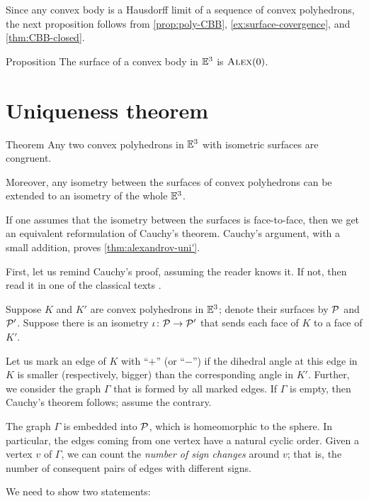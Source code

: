 Since any convex body is a Hausdorff limit of a sequence of convex polyhedrons, the next proposition follows from \ref{prop:poly-CBB}, \ref{ex:surface-covergence}, and \ref{thm:CBB-closed}.

\begin{thm}{Proposition}\label{prop:conv-surf-CBB(0)}
The surface of a convex body in $\mathbb{E}^3$ is $\textsc{Alex}(0)$.
\end{thm}

\section{Uniqueness theorem}

\begin{thm}{Theorem}\label{thm:alexandrov-uni'}
Any two convex polyhedrons in $\mathbb{E}^3$ with isometric surfaces are congruent.

Moreover, any isometry between the surfaces of convex polyhedrons can be extended to an isometry of the whole $\mathbb{E}^3$.
\end{thm}

If one assumes that the isometry between the surfaces is face-to-face,
then we get an equivalent reformulation of Cauchy's theorem.
Cauchy's argument, with a small addition, proves \ref{thm:alexandrov-uni'}.

First, let us remind Cauchy's proof, assuming the reader knows it.
If not, then read it in one of the classical texts \cite{aigner-zigler,dolbilin,tabacnikov-fuks}.

Suppose $K$ and $K'$ are convex polyhedrons in $\mathbb{E}^3$;
denote their surfaces
by $\mathcal{P}$ and $\mathcal{P}'$.
Suppose there is an isometry $\iota\colon\mathcal{P}\to \mathcal{P}'$ that sends each face of $K$ to a face of $K'$.

Let us mark an edge of $K$ with ``$+$'' (or ``$-$'') if the dihedral angle at this edge in $K$ is smaller (respectively, bigger) than the corresponding angle in $K'$.
Further, we consider the  graph $\Gamma$ that is formed by all marked edges.
If $\Gamma$ is empty, then Cauchy's theorem follows; assume the contrary.

The graph $\Gamma$ is embedded into $\mathcal{P}$, which is homeomorphic to the sphere.
In particular, the edges coming from one vertex have a natural cyclic order.
Given a vertex $v$ of $\Gamma$, we can count the \textit{number of sign changes} around $v$;
that is, the number of consequent pairs of edges with different signs.

We need to show two statements:

